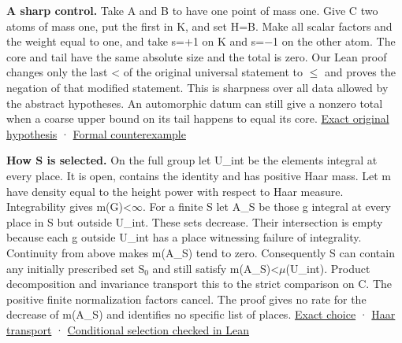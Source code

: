 \documentclass[11pt,letterpaper]{article}
\begin{document}
\textbf{A sharp control.} Take A and B to have one point of mass one. Give C two atoms of mass one, put the first in K, and set H=B. Make all scalar factors and the weight equal to one, and take s=+1 on K and s=\ensuremath{-}1 on the other atom. The core and tail have the same absolute size and the total is zero. Our Lean proof changes only the last {\ttfamily\small <} of the original universal statement to {\ttfamily\small \ensuremath{\le}} and proves the negation of that modified statement. This is sharpness over all data allowed by the abstract hypotheses. An automorphic datum can still give a nonzero total when a coarse upper bound on its tail happens to equal its core. \href{https://github.com/nousentllc/riemann-hypothesis/blob/40e56bab026552e089d7afcfeff08d2defb9c005/src/Development/AutomorphicArithmetic/Foundations/GaloisRepresentations/ThetaParseval/SchurStep.lean\#L183-L189}{Exact original hypothesis} · \href{https://github.com/nousentllc/riemann-hypothesis/blob/003f8090b9894fb955d0925ea1b7f7da64a823c3/research/uriel/experiments/stable-range-theta/verification/WeakTail.lean}{Formal counterexample}

\textbf{How S is selected.} On the full group let U\_int be the elements integral at every place. It is open, contains the identity and has positive Haar mass. Let m have density equal to the height power with respect to Haar measure. Integrability gives m(G)<\ensuremath{\infty}. For a finite S let A\_S be those g integral at every place in S but outside U\_int. These sets decrease. Their intersection is empty because each g outside U\_int has a place witnessing failure of integrality. Continuity from above makes m(A\_S) tend to zero. Consequently S can contain any initially prescribed set S\ensuremath{{}_{0}} and still satisfy m(A\_S)<\ensuremath{\mu}(U\_int). Product decomposition and invariance transport this to the strict comparison on C. The positive finite normalization factors cancel. The proof gives no rate for the decrease of m(A\_S) and identifies no specific list of places. \href{https://github.com/nousentllc/riemann-hypothesis/blob/40e56bab026552e089d7afcfeff08d2defb9c005/src/Development/AutomorphicArithmetic/Foundations/GaloisRepresentations/ThetaParseval/ThetaKernels/TPGTail.lean\#L119-L140}{Exact choice} · \href{https://github.com/nousentllc/riemann-hypothesis/blob/40e56bab026552e089d7afcfeff08d2defb9c005/src/Development/AutomorphicArithmetic/Foundations/GaloisRepresentations/ThetaParseval/ThetaKernels/TPGTail.lean\#L17-L64}{Haar transport} · \href{https://github.com/nousentllc/riemann-hypothesis/blob/003f8090b9894fb955d0925ea1b7f7da64a823c3/research/uriel/experiments/stable-range-theta/verification/TailSelection.lean}{Conditional selection checked in Lean}
\end{document}
